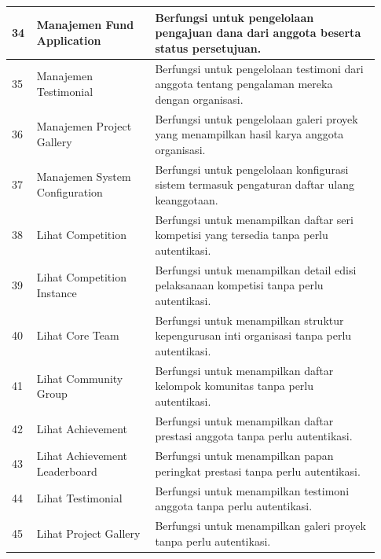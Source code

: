 \begin{longtable}{|p{0.05\linewidth}|p{0.30\linewidth}|p{0.58\linewidth}|}
      \hline
      34          & Manajemen Fund Application             & Berfungsi untuk pengelolaan pengajuan dana dari anggota beserta status persetujuan.                   \\
      \hline
      35          & Manajemen Testimonial                  & Berfungsi untuk pengelolaan testimoni dari anggota tentang pengalaman mereka dengan organisasi.       \\
      \hline
      36          & Manajemen Project Gallery              & Berfungsi untuk pengelolaan galeri proyek yang menampilkan hasil karya anggota organisasi.            \\
      \hline
      37          & Manajemen System Configuration         & Berfungsi untuk pengelolaan konfigurasi sistem termasuk pengaturan daftar ulang keanggotaan.          \\
      \hline
      38          & Lihat Competition                      & Berfungsi untuk menampilkan daftar seri kompetisi yang tersedia tanpa perlu autentikasi.              \\
      \hline
      39          & Lihat Competition Instance             & Berfungsi untuk menampilkan detail edisi pelaksanaan kompetisi tanpa perlu autentikasi.               \\
      \hline
      40          & Lihat Core Team                        & Berfungsi untuk menampilkan struktur kepengurusan inti organisasi tanpa perlu autentikasi.            \\
      \hline
      41          & Lihat Community Group                  & Berfungsi untuk menampilkan daftar kelompok komunitas tanpa perlu autentikasi.                        \\
      \hline
      42          & Lihat Achievement                      & Berfungsi untuk menampilkan daftar prestasi anggota tanpa perlu autentikasi.                          \\
      \hline
      43          & Lihat Achievement Leaderboard          & Berfungsi untuk menampilkan papan peringkat prestasi tanpa perlu autentikasi.                         \\
      \hline
      44          & Lihat Testimonial                      & Berfungsi untuk menampilkan testimoni anggota tanpa perlu autentikasi.                                \\
      \hline
      45          & Lihat Project Gallery                  & Berfungsi untuk menampilkan galeri proyek tanpa perlu autentikasi.                                    \\
      \hline
\end{longtable}

